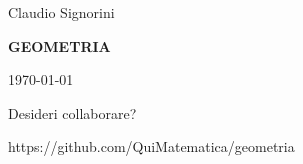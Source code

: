 \begin{titlepage}
    \begin{center}
        \vspace*{1cm}
        
        \LARGE
        Claudio Signorini
        
        \vspace{1.5cm}
        
        \Huge
        \textbf{GEOMETRIA}
        
        \vspace{1.5cm}
                    
        \LARGE
        \today

        \vfill

        \normalsize
        Desideri collaborare?

        https://github.com/QuiMatematica/geometria
        
    \end{center}
\end{titlepage}